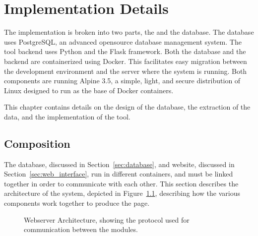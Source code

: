 \chapter{Implementation Details}\label{chap:implementation_details}

The implementation is broken into two parts, the \tool{} and the
database.
The database uses PostgreSQL, an advanced opensource database management
system. The tool backend uses Python and the Flask framework.
Both the database and the \tool{} backend are containerized using
Docker. This facilitates easy migration between the development
environment and the server where the system is running. Both components
are running Alpine 3.5, a simple, light, and secure distribution of
Linux designed to run as the base of Docker containers.

This chapter contains details on the design of the database, the
extraction of the data, and the implementation of the tool.

\section{Composition}\label{sec:composition}

The database, discussed in Section~\ref{sec:database}, and website,
discussed in Section~\ref{sec:web_interface}, run in different
containers, and must be linked together in order to communicate with
each other.
This section describes the architecture of the system, depicted in
Figure~\ref{fig:webserver_architecture}, describing how the various
components work together to produce the page.

\begin{figure}[htpb]
  \begin{center}
  \end{center}
  \caption{Webserver Architecture, showing the protocol used for
    communication between the modules.}
  \label{fig:webserver_architecture}
\end{figure}

